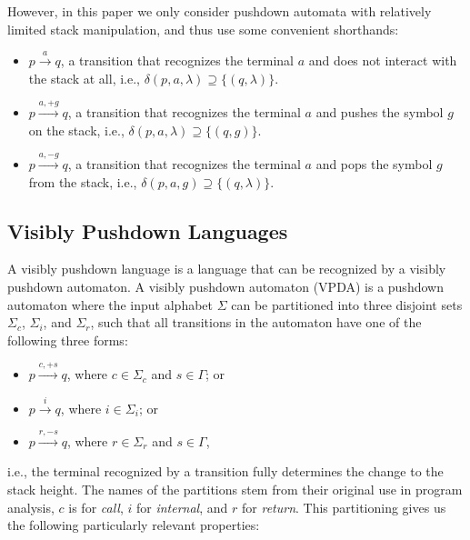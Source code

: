 \documentclass[runningheads]{llncs}
\newcommand{\T}{\Sigma} %
\begin{document}
However, in this paper we only consider pushdown automata with relatively limited stack manipulation, and thus use some convenient shorthands:

\begin{itemize}
\item $p \xrightarrow{a} q$, a transition that recognizes the terminal $a$ and does not interact with the stack at all, i.e., $\delta(p, a, \lambda) \supseteq \{(q, \lambda)\}$.
\item $p \xrightarrow{a, +g} q$, a transition that recognizes the terminal $a$ and pushes the symbol $g$ on the stack, i.e., $\delta(p, a, \lambda) \supseteq \{(q, g)\}$.
\item $p \xrightarrow{a, -g} q$, a transition that recognizes the terminal $a$ and pops the symbol $g$ from the stack, i.e., $\delta(p, a, g) \supseteq \{(q, \lambda)\}$.
\end{itemize}

\subsection{Visibly Pushdown Languages} \label{sec:preliminaries-vpls}

A visibly pushdown language \cite{alurVisiblyPushdownLanguages2004} is a language that can be recognized by a visibly pushdown automaton. A visibly pushdown automaton (VPDA) is a pushdown automaton where the input alphabet $\T$ can be partitioned into three disjoint sets $\T_c$, $\T_i$, and $\T_r$, such that all transitions in the automaton have one of the following three forms:

\begin{itemize}
\item $p \xrightarrow{c, +s} q$, where $c \in \T_c$ and $s \in \Gamma$; or
\item $p \xrightarrow{i} q$, where $i \in \T_i$; or
\item $p \xrightarrow{r, -s} q$, where $r \in \T_r$ and $s \in \Gamma$,
\end{itemize}

\noindent i.e., the terminal recognized by a transition fully determines the change to the stack height.
%
The names of the partitions stem from their original use in program analysis, $c$ is for \emph{call}, $i$ for \emph{internal}, and $r$ for \emph{return}.
%
This partitioning gives us the following particularly relevant properties:
\end{document}
